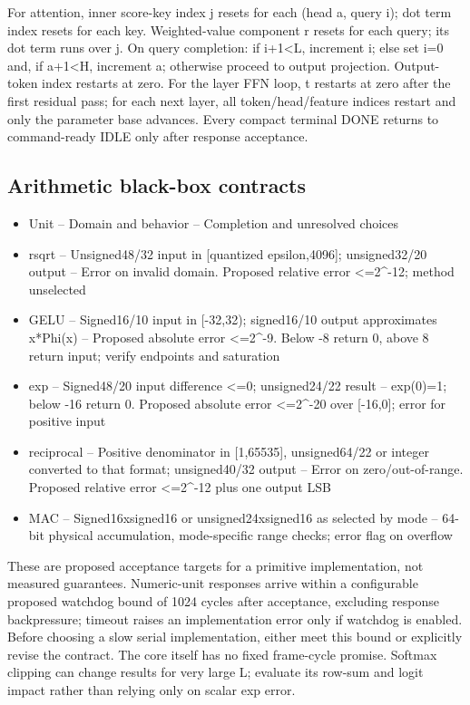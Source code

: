 \documentclass[11pt,a4paper]{article}
\begin{document}
For attention, inner score-key index j resets for each (head a, query i); dot term index resets for each key. Weighted-value component r resets for each query; its dot term runs over j. On query completion: if i+1<L, increment i; else set i=0 and, if a+1<H, increment a; otherwise proceed to output projection. Output-token index restarts at zero. For the layer FFN loop, t restarts at zero after the first residual pass; for each next layer, all token/head/feature indices restart and only the parameter base advances. Every compact terminal DONE returns to command-ready IDLE only after response acceptance.

\subsection{Arithmetic black-box contracts}
\begin{itemize}
\item Unit -- Domain and behavior -- Completion and unresolved choices
\item rsqrt -- Unsigned48/32 input in [quantized epsilon,4096]; unsigned32/20 output -- Error on invalid domain. Proposed relative error <=2\textasciicircum{}-12; method unselected
\item GELU -- Signed16/10 input in [-32,32); signed16/10 output approximates x*Phi(x) -- Proposed absolute error <=2\textasciicircum{}-9. Below -8 return 0, above 8 return input; verify endpoints and saturation
\item exp -- Signed48/20 input difference <=0; unsigned24/22 result -- exp(0)=1; below -16 return 0. Proposed absolute error <=2\textasciicircum{}-20 over [-16,0]; error for positive input
\item reciprocal -- Positive denominator in [1,65535], unsigned64/22 or integer converted to that format; unsigned40/32 output -- Error on zero/out-of-range. Proposed relative error <=2\textasciicircum{}-12 plus one output LSB
\item MAC -- Signed16xsigned16 or unsigned24xsigned16 as selected by mode -- 64-bit physical accumulation, mode-specific range checks; error flag on overflow
\end{itemize}


These are proposed acceptance targets for a primitive implementation, not measured guarantees. Numeric-unit responses arrive within a configurable proposed watchdog bound of 1024 cycles after acceptance, excluding response backpressure; timeout raises an implementation error only if watchdog is enabled. Before choosing a slow serial implementation, either meet this bound or explicitly revise the contract. The core itself has no fixed frame-cycle promise. Softmax clipping can change results for very large L; evaluate its row-sum and logit impact rather than relying only on scalar exp error.
\end{document}
